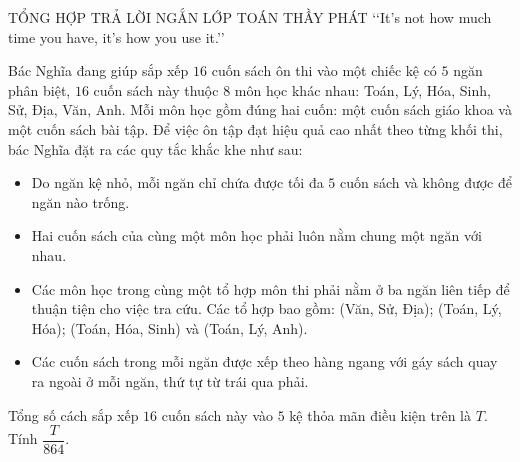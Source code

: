 \setcounter{deso}{0}
\begin{name}
	{\tenchude}
	{TỔNG HỢP TRẢ LỜI NGẮN}
	{LỚP TOÁN THẦY PHÁT}
	{\lq\lq  It's not how much time you have, it's how you use it.\rq\rq}
\end{name}
\setcounter{ex}{0}
\begin{ex}%
	Bác Nghĩa đang giúp sắp xếp $16$ cuốn sách ôn thi vào một chiếc kệ có $5$ ngăn phân biệt, $16$ cuốn sách này thuộc $8$ môn học khác nhau: Toán, Lý, Hóa, Sinh, Sử, Địa, Văn, Anh. Mỗi môn học gồm đúng hai cuốn: một cuốn sách giáo khoa và một cuốn sách bài tập.  Để việc ôn tập đạt hiệu quả cao nhất theo từng khối thi, bác Nghĩa đặt ra các quy tắc khắc khe như sau: 
	\begin{itemize}
		\item Do ngăn kệ nhỏ, mỗi ngăn chỉ chứa được tối đa $5$ cuốn sách và không được để ngăn nào trống.
		\item Hai cuốn sách của cùng một môn học phải luôn nằm chung một ngăn với nhau.
		\item Các môn học trong cùng một tổ hợp môn thi phải nằm ở ba ngăn liên tiếp để thuận tiện cho việc tra cứu. Các tổ hợp bao gồm: (Văn, Sử, Địa); (Toán, Lý, Hóa); (Toán, Hóa, Sinh) và (Toán, Lý, Anh).
		\item Các cuốn sách trong mỗi ngăn được xếp theo hàng ngang với gáy sách quay ra ngoài ở mỗi ngăn, thứ tự từ trái qua phải.
	\end{itemize}
	Tổng số cách sắp xếp $16$ cuốn sách này vào $5$ kệ thỏa mãn điều kiện trên là $T$. Tính $\dfrac{T}{864} $.
	\par{}
\end{ex}
